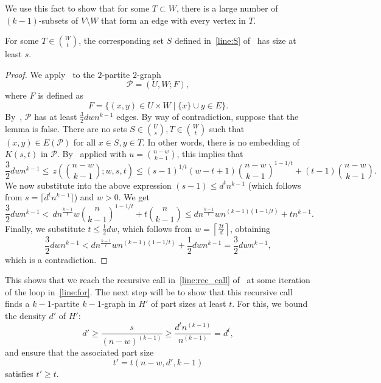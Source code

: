 We use this fact to show that for some $T \subset W$,
there is a large number of $(k-1)$-subsets of $V \setminus W$
that form an edge with every vertex in $T$.

\begin{lemma}\label{lm:return}
    For some $T \in \binom{W}{t}$, the corresponding set $S$ defined
    in~\cref{line:S} of~ has size at least $s$.
    \begin{proof}
        We apply~ to the $2$-partite $2$-graph
        \[
            \mathcal{P} = (U, W; F),
        \]
        where $F$ is defined as
        \[
            F = \{(x, y) \in U \times W \mid \{x\} \cup y \in E \}.
        \]
        By~, $\mathcal{P}$ has at least
        $\frac{3}{2}dwn^{k-1}$ edges.
        By way of contradiction, suppose that the lemma is false.
        There are no sets $S \in \binom{U}{s}, T \in \binom{W}{t}$
        such that $(x, y) \in E (\mathcal{P})$ for all $x \in S, y \in T $.
        In other words, there is no embedding of $K(s, t)$ in $\mathcal{P}$.
        By~ applied with $u = \binom{n-w}{k-1}$,
        this implies that
        \[
            \frac{3}{2}dwn^{k-1} \leq
            \, z \left(\binom{n - w}{k-1}; w, s, t  \right) \leq
            (s-1)^{1/t}(w-t+1)\binom{n-w}{k-1}^{1-1/t} + (t-1)\binom{n-w}{k-1}.
        \]
        We now substitute into the above expression $(s-1) \leq d^t n^{k-1}$ (which
        follows from $s = \lceil d^t n^{k-1} \rceil$) and $w > 0$.
        We get
        \[
             \frac{3}{2}dwn^{k-1} <
             \, dn^{\frac{k-1}{t}} w \binom{n}{k-1}^{1-1/t} + t \binom{n}{k-1} \leq
             dn^{\frac{k-1}{t}} wn^{(k-1)(1-1/t)} + tn^{k-1}.
        \]
        Finally, we substitute $t \leq \frac{1}{2}dw$, which follows from
        $w = \left\lceil \frac{2t}{d} \right\rceil$, obtaining
        \[
            \frac{3}{2}dwn^{k-1} <
            dn^{\frac{k-1}{t}} wn^{(k-1)(1-1/t)} + \frac{1}{2} dwn^{k-1} =
            \frac{3}{2} dwn^{k-1},
        \]
        which is a contradiction.
    \end{proof}
\end{lemma}

This shows that we reach the recursive call in~\cref{line:rec_call} of~
at some iteration of the loop in~\cref{line:for}.
The next step will be to show that this recursive call finds a $k-1$-partite $k-1$-graph in $H'$ of
part sizes at least $t$.
For this, we bound the density $d'$ of $H'$:
\[
    d' \geq \frac{s}{(n-w)^{(k-1)}} \geq \frac{d^t n^{(k-1)}}{n^{(k-1)}} = d^t,
\]
and ensure that the associated part size
\[
    t' = t(n - w, d', k - 1)
\]
satisfies $t' \geq t$.

